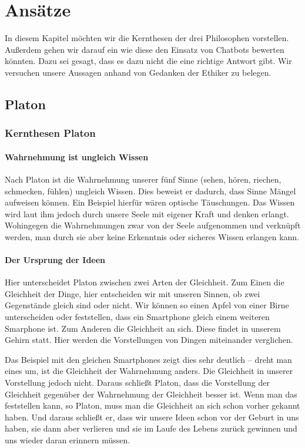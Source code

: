 \section{Ansätze}
In diesem Kapitel möchten wir die Kernthesen der drei Philosophen vorstellen. Außerdem gehen wir darauf ein wie diese den Einsatz von Chatbots bewerten könnten. Dazu sei gesagt, dass es dazu nicht die eine richtige Antwort gibt. Wir versuchen unsere Aussagen anhand von Gedanken der Ethiker zu belegen. 

\subsection{Platon}

\subsubsection{Kernthesen Platon}

\paragraph{Wahrnehmung ist ungleich Wissen} 
Nach Platon ist die Wahrnehmung unserer fünf Sinne (sehen, hören, riechen, schmecken, fühlen) ungleich Wissen. Dies beweist er dadurch, dass Sinne Mängel aufweisen können. Ein Beispiel hierfür wären optische Täuschungen. Das Wissen wird laut ihm jedoch durch unsere Seele mit eigener Kraft und denken erlangt. Wohingegen die Wahrnehmungen zwar von der Seele aufgenommen und verknüpft werden, man durch sie aber keine Erkenntnis oder sicheres Wissen erlangen kann.

\paragraph{Der Ursprung der Ideen} 
Hier unterscheidet Platon zwischen zwei Arten der Gleichheit.
Zum Einen die Gleichheit der Dinge, hier entscheiden wir mit unseren Sinnen, ob zwei Gegenstände gleich sind oder nicht. Wir können so einen Apfel von einer Birne unterscheiden oder feststellen, dass ein Smartphone gleich einem weiteren Smarphone ist.
Zum Anderen die Gleichheit an sich. Diese findet in unserem Gehirn statt. 
Hier werden die Vorstellungen von Dingen miteinander verglichen.

Das Beispiel mit den gleichen Smartphones zeigt dies sehr deutlich -- dreht man eines um, ist die Gleichheit der Wahrnehmung anders. Die Gleichheit in unserer Vorstellung jedoch nicht. Daraus schließt Platon, dass die Vorstellung der Gleichheit gegenüber der Wahrnehmung der Gleichheit besser ist. Wenn man das feststellen kann, so Platon, muss man die Gleichheit an sich schon vorher gekannt haben. Und daraus schließt er, dass wir unsere Ideen schon vor der Geburt in uns haben, sie dann aber verlieren und sie im Laufe des Lebens zurück gewinnen und uns wieder daran erinnern müssen.

